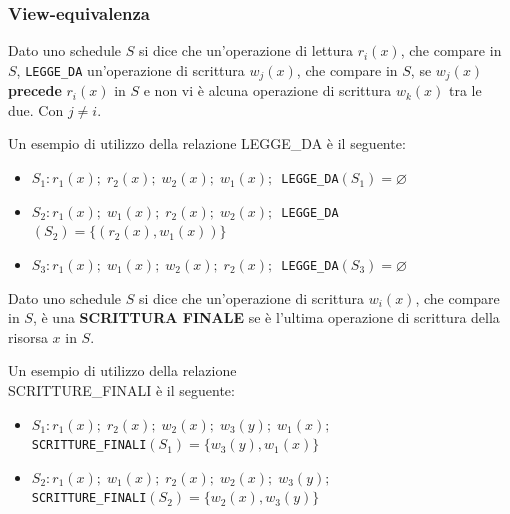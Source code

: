 \documentclass[a4paper]{article}
\begin{document}
\subsubsection{View-equivalenza}
\begin{definition}
  Dato uno schedule \( S \) si dice che un'operazione di lettura \( r_i(x) \), che
  compare in \( S \), \texttt{LEGGE\_DA} un'operazione di scrittura \( w_j(x) \), che
  compare in \( S \), se \( w_j(x) \) \textbf{precede} \( r_i(x) \) in \( S \) e non
  vi è alcuna operazione di scrittura \( w_k(x) \) tra le due. Con \( j \neq i \).

  \begin{example}
    Un esempio di utilizzo della relazione LEGGE\_DA è il seguente:
    \begin{itemize}
      \item \( S_1: r_1(x);\; r_2(x);\; w_2(x);\; w_1(x);\, \) 
        \texttt{LEGGE\_DA}\( (S_1) = \varnothing \) 

      \item \( S_2: r_1(x);\; w_1(x);\; r_2(x);\; w_2(x);\, \) 
        \texttt{LEGGE\_DA}\( (S_2) = \{ (r_2(x), w_1(x)) \} \)

      \item \( S_3: r_1(x);\; w_1(x);\; w_2(x);\; r_2(x);\, \) 
        \texttt{LEGGE\_DA}\( (S_3) = \varnothing \)
    \end{itemize}
  \end{example}
\end{definition}

\begin{definition}
  Dato uno schedule \( S \) si dice che un'operazione di scrittura \( w_i(x) \), che
  compare in \( S \), è una \textbf{SCRITTURA FINALE} se è l'ultima operazione di
  scrittura della risorsa \( x \) in \( S \).

  \begin{example}
    Un esempio di utilizzo della relazione \\ SCRITTURE\_FINALI è il seguente:
    \begin{itemize}
      \item \( S_1: r_1(x);\; r_2(x);\; w_2(x);\; w_3(y);\; w_1(x); \) \\
        \texttt{SCRITTURE\_FINALI}\( (S_1) = \{ w_3(y), w_1(x) \} \)

      \item \( S_2: r_1(x);\; w_1(x);\; r_2(x);\; w_2(x);\; w_3(y); \) \\
        \texttt{SCRITTURE\_FINALI}\( (S_2) = \{ w_2(x), w_3(y) \} \)
    \end{itemize}
  \end{example}
\end{definition}
\end{document}
